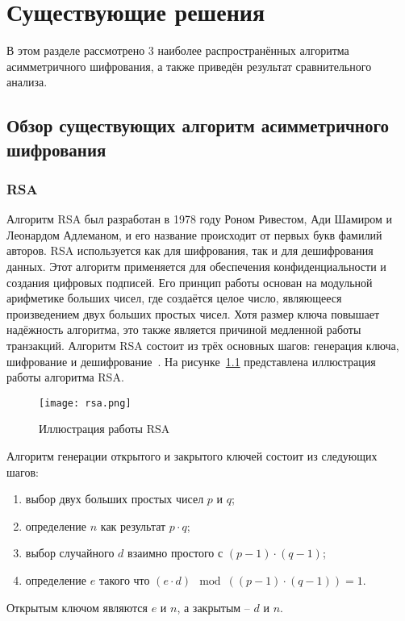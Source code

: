 \chapter{Существующие решения}

В этом разделе рассмотрено 3 наиболее распространённых алгоритма асимметричного шифрования, а также приведён результат сравнительного анализа.

\section{Обзор существующих алгоритм асимметричного шифрования}

\subsection{RSA}

Алгоритм RSA был разработан в 1978 году Роном Ривестом, Ади Шамиром и Леонардом Адлеманом, и его название происходит от первых букв фамилий авторов. RSA используется как для шифрования, так и для дешифрования данных. Этот алгоритм применяется для обеспечения конфиденциальности и создания цифровых подписей. Его принцип работы основан на модульной арифметике больших чисел, где создаётся целое число, являющееся произведением двух больших простых чисел. Хотя размер ключа повышает надёжность алгоритма, это также является причиной медленной работы транзакций. Алгоритм RSA состоит из трёх основных шагов: генерация ключа, шифрование и дешифрование~\cite{encrypting}. На рисунке~\ref{fig:rsa} представлена иллюстрация работы алгоритма RSA.

\begin{figure}[H]
	\centering
	\texttt{[image: rsa.png]}
	\caption{Иллюстрация работы RSA}
	\label{fig:rsa}
\end{figure}

Алгоритм генерации открытого и закрытого ключей состоит из следующих шагов:
\begin{enumerate}
	\item выбор двух больших простых чисел $p$ и $q$;
	\item определение $n$ как результат $p \cdot q$;
	\item выбор случайного $d$ взаимно простого с $(p-1) \cdot (q - 1)$;
	\item определение $e$ такого что $(e \cdot d) \mod ((p-1)\cdot(q-1)) = 1$.
\end{enumerate}

Открытым ключом являются $e$ и $n$, а закрытым -- $d$ и $n$.

